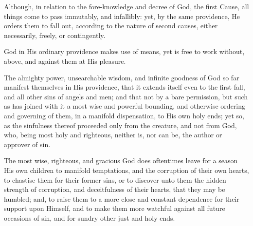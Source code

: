 \begin{outerlst}[left=0pt,labelsep=0pt]
\begin{innerlst}[resume*]
\item Although, in relation to the fore-knowledge and decree of God, the first Cause, all things come to pass immutably, and infallibly: yet, by the same providence, He orders them to fall out, according to the nature of second causes, either necessarily, freely, or contingently.   

\item God in His ordinary providence makes use of means, yet is free to work without, above, and against them at His pleasure.   

\item The almighty power, unsearchable wisdom, and infinite goodness of God so far manifest themselves in His providence, that it extends itself even to the first fall, and all other sins of angels and men; and that not by a bare permission, but such as has joined with it a most wise and powerful bounding, and otherwise ordering and governing of them, in a manifold dispensation, to His own holy ends; yet so, as the sinfulness thereof proceeded only from the creature, and not from God, who, being most holy and righteous, neither is, nor can be, the author or approver of sin.

\item The most wise, righteous, and gracious God does oftentimes leave for a season His own children to manifold temptations, and the corruption of their own hearts, to chastise them for their former sins, or to discover unto them the hidden strength of corruption, and deceitfulness of their hearts, that they may be humbled; and, to raise them to a more close and constant dependence for their support upon Himself, and to make them more watchful against all future occasions of sin, and for sundry other just and holy ends.   


\end{innerlst}
\end{outerlst}
